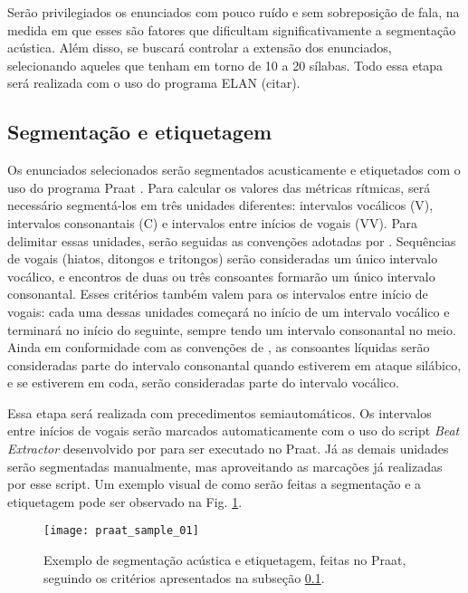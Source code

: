 \documentclass[
		a4paper,	%
		12pt,		%
		]{article}	%
\begin{document}
	Serão privilegiados os enunciados com pouco ruído e sem sobreposição de
	fala, na medida em que esses são fatores que dificultam significativamente a
	segmentação acústica. Além disso, se buscará controlar a extensão dos
	enunciados, selecionando aqueles que tenham em torno de 10 a 20 sílabas.
	Todo essa etapa será realizada com o uso do programa ELAN (citar).
	
	\subsection{Segmentação e etiquetagem} \label{segm}

	Os enunciados selecionados serão segmentados acusticamente e etiquetados com
	o uso do programa Praat \citep{Boersma.Weenink2019}. Para calcular os
	valores das métricas rítmicas, será necessário segmentá-los em três unidades
	diferentes: intervalos vocálicos (V), intervalos consonantais (C) e
	intervalos entre inícios de vogais (VV). Para delimitar essas unidades,
	serão seguidas as convenções adotadas por \citet{Ramus.etal1999}.
	Sequências de vogais (hiatos, ditongos e tritongos) serão consideradas um
	único intervalo vocálico, e encontros de duas ou três consoantes formarão um
	único intervalo consonantal. Esses critérios também valem para os intervalos
	entre início de vogais: cada uma dessas unidades começará no início de um
	intervalo vocálico e terminará no início do seguinte, sempre tendo um
	intervalo consonantal no meio. Ainda em conformidade com as convenções de
	\citet{Ramus.etal1999}, as consoantes líquidas serão consideradas parte do
	intervalo consonantal quando estiverem em ataque silábico, e se estiverem em
	coda, serão consideradas parte do intervalo vocálico.

	Essa etapa será realizada com precedimentos semiautomáticos. Os intervalos
	entre inícios de vogais serão marcados automaticamente com o uso do script
	\emph{Beat Extractor} desenvolvido por \citet{Barbosa2003} para ser
	executado no Praat. Já as demais unidades serão segmentadas manualmente, mas
	aproveitando as marcações já realizadas por esse script. Um exemplo visual
	de como serão feitas a segmentação e a etiquetagem pode ser observado na
	Fig. \ref{praat}.

	\begin{figure}[h]
		\vspace{1em}
		\caption{Exemplo de segmentação acústica e etiquetagem, feitas no Praat,
			seguindo os critérios apresentados na subseção \ref{segm}.}
		\label{praat}
		\centering
		\texttt{[image: praat\_sample\_01]}
	\end{figure} %
		
\end{document}
